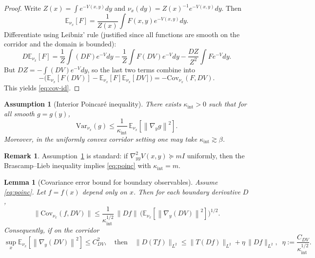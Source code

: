 \documentclass[11pt]{article}
\newtheorem{lemma}[theorem]{Lemma}
\newtheorem{assumption}[theorem]{Assumption}
\theoremstyle{definition}
\newtheorem{remark}[theorem]{Remark}
\newcommand{\E}{\mathbb{E}}
\newcommand{\Var}{\mathrm{Var}}
\newcommand{\Cov}{\mathrm{Cov}}
\newcommand{\1}{\mathbf{1}}
\newcommand{\norm}[1]{\left\lVert#1\right\rVert}
\begin{document}
\begin{proof}
Write $Z(x)=\int e^{-V(x,y)}dy$ and $\nu_x(dy)=Z(x)^{-1}e^{-V(x,y)}dy$. Then
\[
\E_{\nu_x}[F]=\frac{1}{Z(x)}\int F(x,y)e^{-V(x,y)}dy.
\]
Differentiate using Leibniz' rule (justified since all functions are smooth on the corridor and the domain is bounded):
\[
D\E_{\nu_x}[F]=\frac{1}{Z}\int (DF)e^{-V}dy-\frac{1}{Z}\int F(DV)e^{-V}dy-\frac{DZ}{Z^2}\int F e^{-V}dy.
\]
But $DZ=-\int (DV)e^{-V}dy$, so the last two terms combine into
\[
-\Big(\E_{\nu_x}[F(DV)]-\E_{\nu_x}[F]\E_{\nu_x}[DV]\Big)=-\Cov_{\nu_x}(F,DV).
\]
This yields \eqref{eq:cov-id}.
\end{proof}

\begin{assumption}[Interior Poincar\'e inequality]\label{ass:poinc}
There exists $\kappa_{\mathrm{int}}>0$ such that for all smooth $g=g(y)$,
\begin{equation}\label{eq:poinc}
\Var_{\nu_x}(g)\le \frac{1}{\kappa_{\mathrm{int}}}\,\E_{\nu_x}[\norm{\nabla_y g}^2].
\end{equation}
Moreover, in the uniformly convex corridor setting one may take $\kappa_{\mathrm{int}}\gtrsim \beta$.
\end{assumption}

\begin{remark}
Assumption~\ref{ass:poinc} is standard: if $\nabla^2_{yy}V(x,y)\succeq m I$ uniformly, then the Brascamp--Lieb inequality implies \eqref{eq:poinc} with $\kappa_{\mathrm{int}}=m$.
\end{remark}

\begin{lemma}[Covariance error bound for boundary observables]\label{lem:cov-error}
Assume \eqref{eq:poinc}. Let $f=f(x)$ depend only on $x$. Then for each boundary derivative $D$,
\begin{equation}\label{eq:cov-bound}
\big\|\Cov_{\nu_x}(f, DV)\big\|
\le \frac{1}{\kappa_{\mathrm{int}}^{1/2}}\,\|Df\|\,\Big(\E_{\nu_x}[\norm{\nabla_y(DV)}^2]\Big)^{1/2}.
\end{equation}
Consequently, if on the corridor
\begin{equation}\label{eq:gradDV-bound}
\sup_{x}\E_{\nu_x}[\norm{\nabla_y(DV)}^2]\le C_{DV}^2,\quad\text{then}\quad
\|D(Tf)\|_{L^2}\le \|T(Df)\|_{L^2}+\eta\,\|Df\|_{L^2},\;\;\eta:=\frac{C_{DV}}{\kappa_{\mathrm{int}}^{1/2}}.
\end{equation}
\end{lemma}
\end{document}
